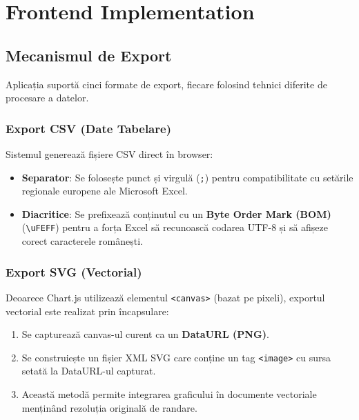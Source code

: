 \documentclass[12pt,a4paper]{article}
\begin{document}
\newpage
\section{Frontend Implementation}

\subsection{Mecanismul de Export}
Aplicația suportă cinci formate de export, fiecare folosind tehnici diferite de procesare a datelor.

\subsubsection{Export CSV (Date Tabelare)}
Sistemul generează fișiere CSV direct în browser:
\begin{itemize}
    \item \textbf{Separator}: Se folosește punct și virgulă (\texttt{;}) pentru compatibilitate cu setările regionale europene ale Microsoft Excel.
    \item \textbf{Diacritice}: Se prefixează conținutul cu un \textbf{Byte Order Mark (BOM)} (\texttt{\textbackslash uFEFF}) pentru a forța Excel să recunoască codarea UTF-8 și să afișeze corect caracterele românești.
\end{itemize}

\subsubsection{Export SVG (Vectorial)}
Deoarece Chart.js utilizează elementul \texttt{<canvas>} (bazat pe pixeli), exportul vectorial este realizat prin încapsulare:
\begin{enumerate}
    \item Se capturează canvas-ul curent ca un \textbf{DataURL (PNG)}.
    \item Se construiește un fișier XML SVG care conține un tag \texttt{<image>} cu sursa setată la DataURL-ul capturat.
    \item Această metodă permite integrarea graficului în documente vectoriale menținând rezoluția originală de randare.
\end{enumerate}
\end{document}
